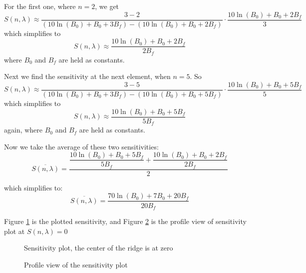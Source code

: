 \documentclass[12pt]{report}
\begin{document}
  \bigskip
  
  For the first one, where $n=2$, we get $$S(n,\lambda)\approx\dfrac{3-2}{(10\ln{(B_0)}+B_0+3B_f)-(10\ln{(B_0)}+B_0+2B_f)}\cdot \dfrac{10\ln{(B_0)}+B_0+2B_f}{3}$$ which simplifies to 
  $$S(n,\lambda)\approx \dfrac{10\ln{(B_0)}+B_0+2B_f}{2B_f}$$ 
  where $B_0$ and $B_f$ are held as constants.
  
  \bigskip 
  
  Next we find the sensitivity at the next element, when $n=5$. So $$S(n,\lambda)\approx\dfrac{3-5}{(10\ln{(B_0)}+B_0+3B_f)-(10\ln{(B_0)}+B_0+5B_f)}\cdot \dfrac{10\ln{(B_0)}+B_0+5B_f}{5}$$
  which simplifies to
  $$S(n,\lambda)\approx \dfrac{10\ln{(B_0)}+B_0+5B_f}{5B_f}$$
  again, where $B_0$ and $B_f$ are held as constants.
  
  \bigskip
  
  Now we take the average of these two sensitivities:
  $$\overline{S(n,\lambda)}=\dfrac{\dfrac{10\ln{(B_0)}+B_0+5B_f}{5B_f} + \dfrac{10\ln{(B_0)}+B_0+2B_f}{2B_f}}{2}$$
  
  which simplifies to:
    $$\overline{S(n,\lambda)}=\dfrac{70\ln{(B_0)}+7B_0+20B_f}{20B_f}  $$
    
    \bigskip
    
    Figure \ref{fig:sensitivity} is the plotted sensitivity, and Figure \ref{fig:profile} is the profile view of sensitivity plot at $S(n,\lambda)=0$

\begin{figure}[th] 
    \centering 
    \label{fig:sensitivity} 
    \caption{Sensitivity plot, the center of the ridge is at zero} 
  \end{figure}
  
  \begin{figure}[th] 
    \centering 
    \label{fig:profile} 
    \caption{Profile view of the sensitivity plot} 
  \end{figure} 
\end{document}
